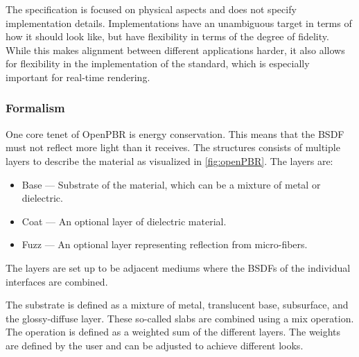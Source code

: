 The specification is focused on physical aspects and does not specify implementation details. Implementations have an unambiguous target in terms of how it should look like, but have flexibility in terms of the degree of fidelity. While this makes alignment between different applications harder, it also allows for flexibility in the implementation of the standard, which is especially important for real-time rendering.

\subsubsection{Formalism}

One core tenet of \gls{OpenPBR} is energy conservation. This means that the \gls{BSDF} must not reflect more light than it receives. The structures consists of multiple layers to describe the material as visualized in \autoref{fig:openPBR}. The layers are:

\begin{itemize}
  \item{Base} — Substrate of the material, which can be a mixture of metal or dielectric.
  \item{Coat} — An optional layer of dielectric material.
  \item{Fuzz} — An optional layer representing reflection from micro-fibers.
\end{itemize}

The layers are set up to be adjacent mediums where the \glspl{BSDF} of the individual interfaces are combined.

The substrate is defined as a mixture of metal, translucent base, subsurface, and the glossy-diffuse layer. These so-called slabs are combined using a mix operation. The operation is defined as a weighted sum of the different layers. The weights are defined by the user and can be adjusted to achieve different looks.

